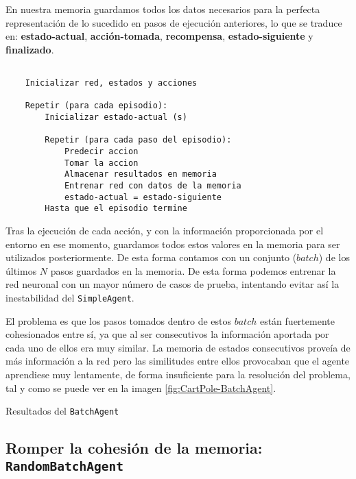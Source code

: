 En nuestra memoria guardamos todos los datos necesarios para la perfecta representación de lo sucedido en pasos de ejecución anteriores, lo que se traduce en: \textbf{estado-actual}, \textbf{acción-tomada}, \textbf{recompensa}, \textbf{estado-siguiente} y \textbf{finalizado}.

\begin{minipage}{0.9\linewidth}%
    \begin{lstlisting}[frame=tb, caption=Pseudocódigo BatchAgent, inputencoding=latin1, label=code:cartpole_drl2]
    
    Inicializar red, estados y acciones
    
    Repetir (para cada episodio):
        Inicializar estado-actual (s)
        
        Repetir (para cada paso del episodio):
            Predecir accion
            Tomar la accion
            Almacenar resultados en memoria
            Entrenar red con datos de la memoria
            estado-actual = estado-siguiente
        Hasta que el episodio termine
    \end{lstlisting}%
\end{minipage}

Tras la ejecución de cada acción, y con la información proporcionada por el entorno en ese momento, guardamos todos estos valores en la memoria para ser utilizados posteriormente. De esta forma contamos con un conjunto ($batch$) de los últimos $N$ pasos guardados en la memoria. De esta forma podemos entrenar la red neuronal con un mayor número de casos de prueba, intentando evitar así la inestabilidad del \texttt{SimpleAgent}.

El problema es que los pasos tomados dentro de estos $batch$ están fuertemente cohesionados entre sí, ya que al ser consecutivos la información aportada por cada uno de ellos era muy similar. La memoria de estados consecutivos proveía de más información a la red pero las similitudes entre ellos provocaban que el agente aprendiese muy lentamente, de forma insuficiente para la resolución del problema, tal y como se puede ver en la imagen \ref{fig:CartPole-BatchAgent}.

%
       {Resultados del \texttt{BatchAgent}}


\subsection{Romper la cohesión de la memoria: \texttt{RandomBatchAgent}}

